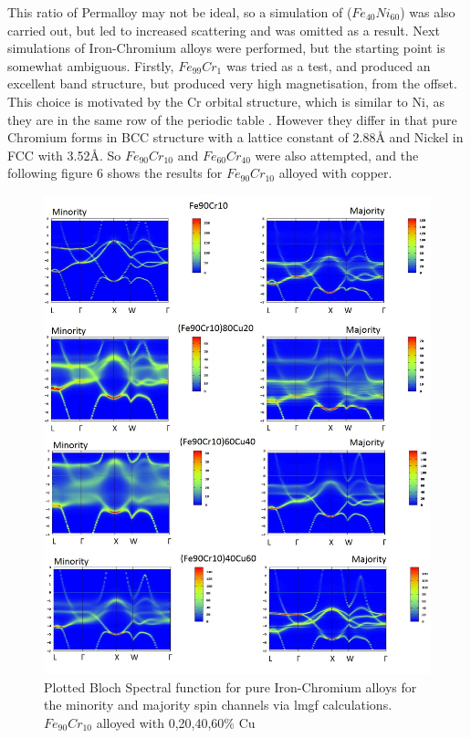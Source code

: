 \documentclass[12pt]{article}
\begin{document}
This ratio of Permalloy may not be ideal, so a simulation of ($Fe_{40}Ni_{60}$) was also carried out, but led to increased scattering and was omitted as a result.
Next simulations of Iron-Chromium alloys were performed, but the starting point is somewhat ambiguous. Firstly, $Fe_{99}Cr_{1}$ was tried as a test, and produced an excellent band structure, but produced very high magnetisation, from the offset. This choice is motivated by the Cr orbital structure, which is similar to Ni, as they are in the same row of the periodic table \cite{ashcroft}. However they differ in that pure Chromium forms in BCC structure with a lattice constant of 2.88{\AA} and Nickel in FCC with 3.52{\AA}\cite{ashcroft}. So $Fe_{90}Cr_{10}$ and $Fe_{60}Cr_{40}$ were also attempted, and the following figure 6 shows the results for $Fe_{90}Cr_{10}$ alloyed with copper.

\begin{figure}[h!]
    \centering
    \begin{measuredfigure}
    \includegraphics[scale=0.40]{complete/Fe90Cr10}
    \caption{Plotted Bloch Spectral function for pure Iron-Chromium alloys for the minority and majority spin channels via lmgf calculations. $Fe_{90}Cr_{10}$ alloyed with 0,20,40,60\% Cu}
    \end{measuredfigure}
    \end{figure}
\end{document}
